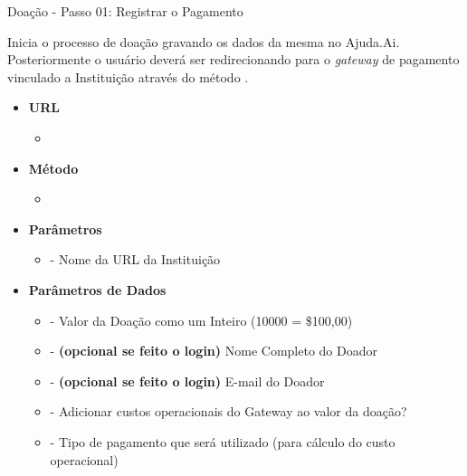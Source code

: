 
\begin{caixa}{Doação - Passo 01: Registrar o Pagamento}{}

Inicia o processo de doação gravando os dados da mesma no Ajuda.Ai. Posteriormente o usuário deverá ser redirecionando para o \emph{gateway} de pagamento vinculado a Instituição através do método .

\begin{itemize}
\item \textbf{URL}
	\begin{itemize}
		\item {}
	\end{itemize}

\item \textbf{Método}
	\begin{itemize}
		\item {}
	\end{itemize}

\item \textbf{Parâmetros}
	\begin{itemize}
		\item {} - Nome da URL da Instituição
	\end{itemize}

\item \textbf{Parâmetros de Dados}
	\begin{itemize}
        \item {} - Valor da Doação como um Inteiro (10000 = \$100,00)
        \item {} - \textbf{(opcional se feito o login)} Nome Completo do Doador
        \item {} - \textbf{(opcional se feito o login)} E-mail do Doador
        \item {} - Adicionar custos operacionais do Gateway ao valor da doação?
        \item {} - Tipo de pagamento que será utilizado (para cálculo do custo operacional)
	\end{itemize}


\end{itemize}
\end{caixa}
